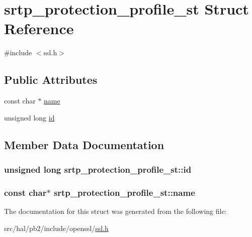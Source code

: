 \hypertarget{structsrtp__protection__profile__st}{}\section{srtp\+\_\+protection\+\_\+profile\+\_\+st Struct Reference}
\label{structsrtp__protection__profile__st}


{\ttfamily \#include $<$ssl.\+h$>$}

\subsection*{Public Attributes}
\begin{DoxyCompactItemize}
\item 
const char $\ast$ \hyperlink{structsrtp__protection__profile__st_a395750555b1a21494c68b99bea8067e8}{name}
\item 
unsigned long \hyperlink{structsrtp__protection__profile__st_a8befcbb11f8a31c6a75e8d44e5618a00}{id}
\end{DoxyCompactItemize}


\subsection{Member Data Documentation}
\subsubsection[{\texorpdfstring{id}{id}}]{\setlength{\rightskip}{0pt plus 5cm}unsigned long srtp\+\_\+protection\+\_\+profile\+\_\+st\+::id}\hypertarget{structsrtp__protection__profile__st_a8befcbb11f8a31c6a75e8d44e5618a00}{}\label{structsrtp__protection__profile__st_a8befcbb11f8a31c6a75e8d44e5618a00}
\subsubsection[{\texorpdfstring{name}{name}}]{\setlength{\rightskip}{0pt plus 5cm}const char$\ast$ srtp\+\_\+protection\+\_\+profile\+\_\+st\+::name}\hypertarget{structsrtp__protection__profile__st_a395750555b1a21494c68b99bea8067e8}{}\label{structsrtp__protection__profile__st_a395750555b1a21494c68b99bea8067e8}


The documentation for this struct was generated from the following file\+:\begin{DoxyCompactItemize}
\item 
src/hal/pb2/include/openssl/\hyperlink{ssl_8h}{ssl.\+h}\end{DoxyCompactItemize}
